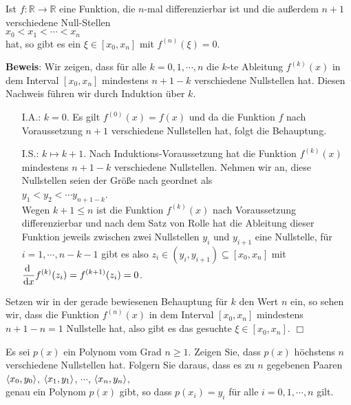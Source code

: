 \begin{Satz}
  Ist $f:\mathbb{R} \rightarrow \mathbb{R}$ eine Funktion, die $n$-mal differenzierbar
  ist und die au{\ss}erdem $n+1$ verschiedene Null-Stellen 
  \\[0.2cm]
  \hspace*{1.3cm}  $x_0 < x_1 < \cdots < x_n$
  \\[0.2cm]
  hat, so gibt es ein $\xi\in[x_0,x_n]$ mit $f^{(n)}(\xi) = 0$.
\end{Satz}
\textbf{Beweis}:  Wir zeigen, dass f\"ur alle $k=0,1,\cdots,n$ die $k$-te Ableitung
$f^{(k)}(x)$ in dem Interval $[x_0,x_n]$ mindestens $n+1-k$ verschiedene Nullstellen hat.
Diesen Nachweis f\"uhren wir durch Induktion \"uber $k$.
\begin{enumerate}
\item[I.A.:] $k=0$. Es gilt $f^{(0)}(x) = f(x)$ und da die Funktion $f$ nach Voraussetzung $n+1$
             verschiedene Nullstellen hat, folgt die Behauptung.
\item[I.S.:] $k\mapsto k+1$.  Nach Induktions-Voraussetzung hat die Funktion
             $f^{(k)}(x)$ mindestens $n + 1 -k$ verschiedene Nullstellen.
             Nehmen wir an, diese Nullstellen seien der Gr\"o{\ss}e nach geordnet als
             \\[0.2cm]
             \hspace*{1.3cm} $y_1 < y_2 < \cdots y_{n+1-k}$. \\[0.2cm]
             Wegen $k+1\leq n$ ist die Funktion $f^{(k)}(x)$ nach Voraussetzung
             differenzierbar und nach dem Satz von Rolle hat die Ableitung dieser Funktion
             jeweils zwischen zwei Nullstellen $y_i$ und $y_{i+1}$ eine Nullstelle, 
             f\"ur $i=1,\cdots,n-k-1$ gibt es also $z_i \in (y_i,y_{i+1}) \subseteq[x_0,x_n]$ mit 
             \\[0.2cm]
             \hspace*{1.3cm} $\displaystyle\frac{\textrm{d}\;}{\textrm{d}x} f^{(k)}(z_i) = f^{(k+1)}(z_i) = 0$.
\end{enumerate}
Setzen wir in der gerade bewiesenen Behauptung f\"ur $k$ den Wert $n$ ein, so sehen wir, dass die Funktion $f^{(n)}(x)$ in dem Interval
$[x_0,x_n]$ mindestens $n+1-n=1$ Nullstelle hat, also gibt es das gesuchte
$\xi\in[x_0,x_n]$.
\hspace*{\fill} $\Box$

\exercise
Es sei $p(x)$  ein Polynom vom Grad $n\geq 1$.  Zeigen Sie, dass
$p(x)$ h\"ochstens $n$ verschiedene Nullstellen hat.  Folgern Sie daraus, dass es zu $n$ gegebenen Paaren 
\\[0.2cm]
\hspace*{1.3cm}
$\pair(x_0,y_0)$, $\pair(x_1,y_1)$, $\cdots$, $\pair(x_n,y_n)$,
\\[0.2cm]
genau ein Polynom $p(x)$ gibt, so dass $p(x_i) = y_i$ f\"ur alle $i=0,1,\cdots,n$ gilt. \eox


